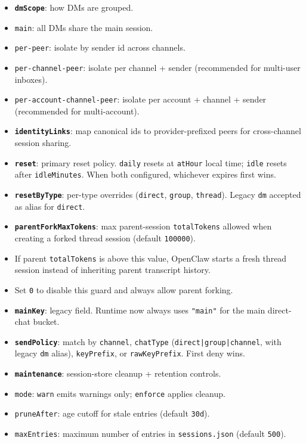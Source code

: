 \begin{itemize}
  \item \textbf{\texttt{dmScope}}: how DMs are grouped.
  \item \texttt{main}: all DMs share the main session.
  \item \texttt{per-peer}: isolate by sender id across channels.
  \item \texttt{per-channel-peer}: isolate per channel + sender (recommended for multi-user inboxes).
  \item \texttt{per-account-channel-peer}: isolate per account + channel + sender (recommended for multi-account).
  \item \textbf{\texttt{identityLinks}}: map canonical ids to provider-prefixed peers for cross-channel session sharing.
  \item \textbf{\texttt{reset}}: primary reset policy. \texttt{daily} resets at \texttt{atHour} local time; \texttt{idle} resets after \texttt{idleMinutes}. When both configured, whichever expires first wins.
  \item \textbf{\texttt{resetByType}}: per-type overrides (\texttt{direct}, \texttt{group}, \texttt{thread}). Legacy \texttt{dm} accepted as alias for \texttt{direct}.
  \item \textbf{\texttt{parentForkMaxTokens}}: max parent-session \texttt{totalTokens} allowed when creating a forked thread session (default \texttt{100000}).
  \item If parent \texttt{totalTokens} is above this value, OpenClaw starts a fresh thread session instead of inheriting parent transcript history.
  \item Set \texttt{0} to disable this guard and always allow parent forking.
  \item \textbf{\texttt{mainKey}}: legacy field. Runtime now always uses \texttt{"main"} for the main direct-chat bucket.
  \item \textbf{\texttt{sendPolicy}}: match by \texttt{channel}, \texttt{chatType} (\texttt{direct|group|channel}, with legacy \texttt{dm} alias), \texttt{keyPrefix}, or \texttt{rawKeyPrefix}. First deny wins.
  \item \textbf{\texttt{maintenance}}: session-store cleanup + retention controls.
  \item \texttt{mode}: \texttt{warn} emits warnings only; \texttt{enforce} applies cleanup.
  \item \texttt{pruneAfter}: age cutoff for stale entries (default \texttt{30d}).
  \item \texttt{maxEntries}: maximum number of entries in \texttt{sessions.json} (default \texttt{500}).

\end{itemize}
